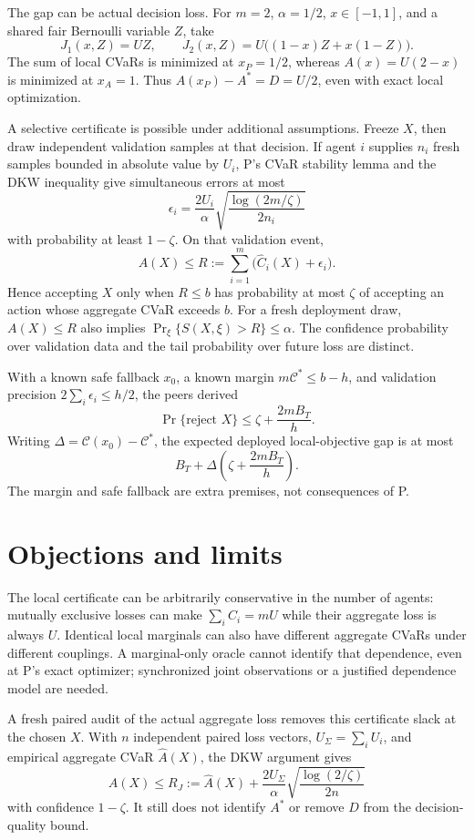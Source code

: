 \documentclass{article}
\begin{document}
The gap can be actual decision loss. For \(m=2\), \(\alpha=1/2\), \(x\in[-1,1]\), and a shared fair Bernoulli variable \(Z\), take
\[
J_1(x,Z)=UZ,\qquad
J_2(x,Z)=U\bigl((1-x)Z+x(1-Z)\bigr).
\]
The sum of local CVaRs is minimized at \(x_P=1/2\), whereas \(A(x)=U(2-x)\) is minimized at \(x_A=1\). Thus \(A(x_P)-A^*=D=U/2\), even with exact local optimization. 

A selective certificate is possible under additional assumptions. Freeze \(X\), then draw independent validation samples at that decision. If agent \(i\) supplies \(n_i\) fresh samples bounded in absolute value by \(U_i\), P's CVaR stability lemma and the DKW inequality give simultaneous errors at most
\[
\epsilon_i=
\frac{2U_i}{\alpha}
\sqrt{\frac{\log(2m/\zeta)}{2n_i}}
\]
with probability at least \(1-\zeta\). On that validation event,
\[
A(X)\leq
R:=\sum_{i=1}^m\bigl(\widehat C_i(X)+\epsilon_i\bigr).
\]
Hence accepting \(X\) only when \(R\leq b\) has probability at most \(\zeta\) of accepting an action whose aggregate CVaR exceeds \(b\). For a fresh deployment draw, \(A(X)\leq R\) also implies
\(\Pr_\xi\{S(X,\xi)>R\}\leq\alpha\).
The confidence probability over validation data and the tail probability over future loss are distinct. 

With a known safe fallback \(x_0\), a known margin
\(m\mathcal C^*\leq b-h\), and validation precision
\(2\sum_i\epsilon_i\leq h/2\), the peers derived
\[
\Pr\{\text{reject }X\}
\leq \zeta+\frac{2mB_T}{h}.
\]
Writing \(\Delta=\mathcal C(x_0)-\mathcal C^*\), the expected deployed local-objective gap is at most
\[
B_T+\Delta\left(\zeta+\frac{2mB_T}{h}\right).
\]
The margin and safe fallback are extra premises, not consequences of P. 

\section*{Objections and limits}

The local certificate can be arbitrarily conservative in the number of agents: mutually exclusive losses can make \(\sum_i C_i=mU\) while their aggregate loss is always \(U\). Identical local marginals can also have different aggregate CVaRs under different couplings. A marginal-only oracle cannot identify that dependence, even at P's exact optimizer; synchronized joint observations or a justified dependence model are needed. 

A fresh paired audit of the actual aggregate loss removes this certificate slack at the chosen \(X\). With \(n\) independent paired loss vectors, \(U_\Sigma=\sum_iU_i\), and empirical aggregate CVaR \(\widehat A(X)\), the DKW argument gives
\[
A(X)\leq R_J:=\widehat A(X)+
\frac{2U_\Sigma}{\alpha}
\sqrt{\frac{\log(2/\zeta)}{2n}}
\]
with confidence \(1-\zeta\). It still does not identify \(A^*\) or remove \(D\) from the decision-quality bound. 
\end{document}
